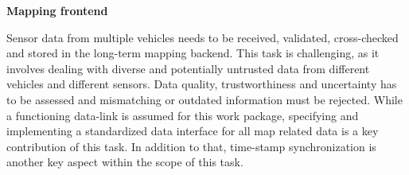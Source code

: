 {\begin{denseItemize}
\end{denseItemize}

\begin{tasks}{\WPMappingNo}
\label{tasks:maloc}



\item  {\bf Mapping frontend}
\taskpartners{\ETHZ}{\IBM}
\label{task:wpmaloc:frontend}

Sensor data from multiple vehicles needs to be received, validated, cross-checked and stored in the long-term mapping backend. This task is challenging, as it involves dealing with diverse and potentially untrusted data from different vehicles and different sensors. Data quality, trustworthiness and uncertainty has to be assessed and mismatching or outdated information must be rejected. While a functioning data-link is assumed for this work package, specifying and implementing a standardized data interface for all map related data is a key contribution of this task. In addition to that, time-stamp synchronization is another key aspect within the scope of this task.



\end{tasks}}
